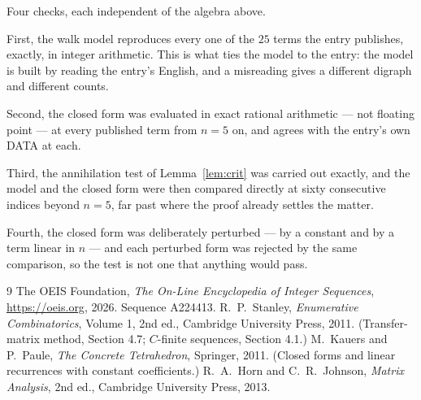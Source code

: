 \documentclass[11pt,a4paper]{article}
\theoremstyle{plain}
\theoremstyle{definition}
\begin{document}
Four checks, each independent of the algebra above.

First, the walk model reproduces every one of the $25$ terms the entry publishes,
exactly, in integer arithmetic. This is what ties the model to the entry: the model is built
by reading the entry's English, and a misreading gives a different digraph and different
counts.

Second, the closed form was evaluated in exact rational arithmetic --- not floating point ---
at every published term from $n=5$ on, and agrees with the entry's own DATA at each.

Third, the annihilation test of Lemma~\ref{lem:crit} was carried out exactly, and the model
and the closed form were then compared directly at sixty consecutive indices beyond
$n=5$, far past where the proof already settles the matter.

Fourth, the closed form was deliberately perturbed --- by a constant and by a term linear in
$n$ --- and each perturbed form was rejected by the same comparison, so the test is not one
that anything would pass.

\begin{thebibliography}{9}
 The OEIS Foundation, \emph{The On-Line Encyclopedia of Integer
Sequences}, \url{https://oeis.org}, 2026. Sequence A224413.
 R.~P.~Stanley, \emph{Enumerative Combinatorics}, Volume 1, 2nd ed.,
Cambridge University Press, 2011. (Transfer-matrix method, Section 4.7; $C$-finite sequences,
Section 4.1.)
 M.~Kauers and P.~Paule, \emph{The Concrete Tetrahedron}, Springer, 2011.
(Closed forms and linear recurrences with constant coefficients.)
 R.~A.~Horn and C.~R.~Johnson, \emph{Matrix Analysis}, 2nd ed., Cambridge
University Press, 2013.
\end{thebibliography}
\end{document}
